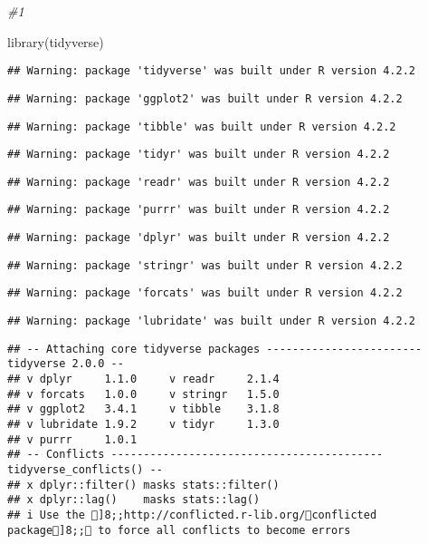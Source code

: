 \documentclass[
]{article}
\newenvironment{Shaded}{\begin{snugshade}}{\end{snugshade}}
\newcommand{\CommentTok}[1]{\textcolor[rgb]{0.56,0.35,0.01}{\textit{#1}}}
\newcommand{\FunctionTok}[1]{\textcolor[rgb]{0.00,0.00,0.00}{#1}}
\newcommand{\NormalTok}[1]{#1}
\begin{document}
\begin{Shaded}
\begin{Highlighting}[]
\CommentTok{\#1 }

\FunctionTok{library}\NormalTok{(tidyverse)}
\end{Highlighting}
\end{Shaded}

\begin{verbatim}
## Warning: package 'tidyverse' was built under R version 4.2.2
\end{verbatim}

\begin{verbatim}
## Warning: package 'ggplot2' was built under R version 4.2.2
\end{verbatim}

\begin{verbatim}
## Warning: package 'tibble' was built under R version 4.2.2
\end{verbatim}

\begin{verbatim}
## Warning: package 'tidyr' was built under R version 4.2.2
\end{verbatim}

\begin{verbatim}
## Warning: package 'readr' was built under R version 4.2.2
\end{verbatim}

\begin{verbatim}
## Warning: package 'purrr' was built under R version 4.2.2
\end{verbatim}

\begin{verbatim}
## Warning: package 'dplyr' was built under R version 4.2.2
\end{verbatim}

\begin{verbatim}
## Warning: package 'stringr' was built under R version 4.2.2
\end{verbatim}

\begin{verbatim}
## Warning: package 'forcats' was built under R version 4.2.2
\end{verbatim}

\begin{verbatim}
## Warning: package 'lubridate' was built under R version 4.2.2
\end{verbatim}

\begin{verbatim}
## -- Attaching core tidyverse packages ------------------------ tidyverse 2.0.0 --
## v dplyr     1.1.0     v readr     2.1.4
## v forcats   1.0.0     v stringr   1.5.0
## v ggplot2   3.4.1     v tibble    3.1.8
## v lubridate 1.9.2     v tidyr     1.3.0
## v purrr     1.0.1     
## -- Conflicts ------------------------------------------ tidyverse_conflicts() --
## x dplyr::filter() masks stats::filter()
## x dplyr::lag()    masks stats::lag()
## i Use the ]8;;http://conflicted.r-lib.org/conflicted package]8;; to force all conflicts to become errors
\end{verbatim}
\end{document}

